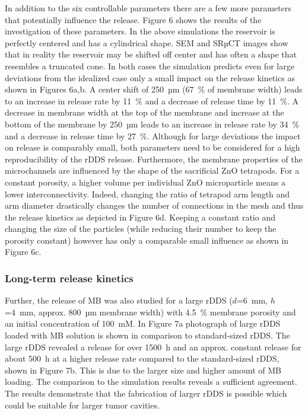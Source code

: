 In addition to the six controllable parameters there are a few more parameters that potentially influence the release. Figure 6 shows the results of the investigation of these parameters. In the above simulations the reservoir is perfectly centered and has a cylindrical shape. SEM and SRµCT images show that in reality the reservoir may be shifted off center and has often a shape that resembles a truncated cone. In both cases the simulation predicts even for large deviations from the idealized case only a small impact on the release kinetics as shown in Figures 6a,b. A center shift of 250~µm (67~\% of membrane width) leads to an increase in release rate by 11~\% and a decrease of release time by 11~\%. A decrease in membrane width at the top of the membrane and increase at the bottom of the membrane by 250~µm leads to an increase in release rate by 34~\% and a decrease in release time by 27~\%. Although for large deviations the impact on release is comparably small, both parameters need to be considered for a high reproducibility of the rDDS release. Furthermore, the membrane properties of the microchannels are influenced by the shape of the sacrificial ZnO tetrapods. For a constant porosity, a higher volume per individual ZnO microparticle means a lower interconnectivity. Indeed, changing the ratio of tetrapod arm length and arm diameter drastically changes the number of connections in the mesh and thus the release kinetics as depicted in Figure 6d. Keeping a constant ratio and changing the size of the particles (while reducing their number to keep the porosity constant) however has only a comparable small influence as shown in Figure 6c. 

\subsubsection{Long-term release kinetics}
Further, the release of MB was also studied for a large rDDS ($d$=6~mm, $h$=4~mm, approx. 800~µm membrane width) with 4.5~\% membrane porosity and an initial concentration of 100~mM. In Figure 7a photograph of large rDDS loaded with MB solution is shown in comparison to standard-sized rDDS. The large rDDS revealed a release for over 1500~h and an approx. constant release for about 500~h at a higher release rate compared to the standard-sized rDDS, shown in Figure 7b. This is due to the larger size and higher amount of MB loading. The comparison to the simulation results reveals a sufficient agreement. The results demonstrate that the fabrication of larger rDDS is possible which could be suitable for larger tumor cavities.

